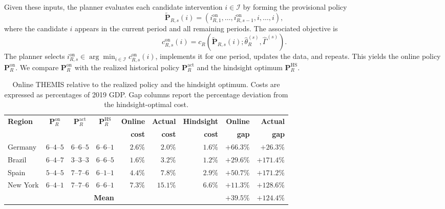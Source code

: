 \documentclass[letterpaper,twoside,11pt]{reviewresponse}
\begin{document}
Given these inputs, the planner evaluates each candidate intervention $i\in\mathcal{I}$ by forming the provisional policy
\[
\widetilde{\bm{P}}_{R,s}(i)
=
\left(i_{R,1}^{\mathrm{on}},\ldots,i_{R,s-1}^{\mathrm{on}},i,\ldots,i\right),
\]
where the candidate $i$ appears in the current period and all remaining periods. The associated objective is
\[
c_{R,s}^{\mathrm{on}}(i)
=
c_R\!\left(\widetilde{\bm{P}}_{R,s}(i); \hat{\theta}_R^{(s)}, \hat{\Gamma}^{(s)}\right).
\]
The planner selects $i_{R,s}^{\mathrm{on}}\in\arg\min_{i\in\mathcal{I}}c_{R,s}^{\mathrm{on}}(i)$, implements it for one period, updates the data, and repeats. This yields the online policy $\bm{P}_R^{\mathrm{on}}$. We compare $\bm{P}_R^{\mathrm{on}}$ with the realized historical policy $\bm{P}_R^{\mathrm{act}}$ and the hindsight optimum $\bm{P}_R^{\mathrm{HS}}$.

\begin{table}[h!]
\centering\footnotesize
\renewcommand{\arraystretch}{1.05}
\begin{tabular}{|l|c|c|c|r|r|r|r|r|}
\hline
\textbf{Region} & $\bm{P}_R^{\mathrm{on}}$ & $\bm{P}_R^{\mathrm{act}}$ & $\bm{P}_R^{\mathrm{HS}}$ & \textbf{Online} & \textbf{Actual} & \textbf{Hindsight} & \textbf{Online} & \textbf{Actual} \\
                &                          &                         &                     & \textbf{cost}   & \textbf{cost}   & \textbf{cost}      & \textbf{gap}    & \textbf{gap}   \\\hline
Germany   & $6$--$4$--$5$ & $6$--$6$--$5$ & $6$--$6$--$1$ & $2.6\%$  & $2.0\%$   & $1.6\%$  & $+66.3\%$ & $+26.3\%$ \\
Brazil    & $6$--$4$--$7$ & $3$--$3$--$3$ & $6$--$6$--$5$ & $1.6\%$   & $3.2\%$  & $1.2\%$  & $+29.6\%$ & $+171.4\%$ \\
Spain     & $5$--$4$--$5$ & $7$--$7$--$6$ & $6$--$1$--$1$ & $4.4\%$  & $7.8\%$  & $2.9\%$ & $+50.7\%$ & $+171.2\%$ \\
New York  & $6$--$4$--$1$ & $7$--$7$--$6$ & $6$--$6$--$1$ & $7.3\%$  & $15.1\%$  & $6.6\%$ & $+11.3\%$ & $+128.6\%$ \\\hline
\multicolumn{4}{|r|}{\textbf{Mean}} & & & & \textbf{$+39.5\%$} & \textbf{$+124.4\%$} \\\hline
\end{tabular}
\caption{Online THEMIS relative to the realized policy and the hindsight optimum. Costs are expressed as percentages of 2019 GDP. Gap columns report the percentage deviation from the hindsight-optimal cost.}
\label{tab:rolling_advisor_v2}
\end{table}
\end{document}
